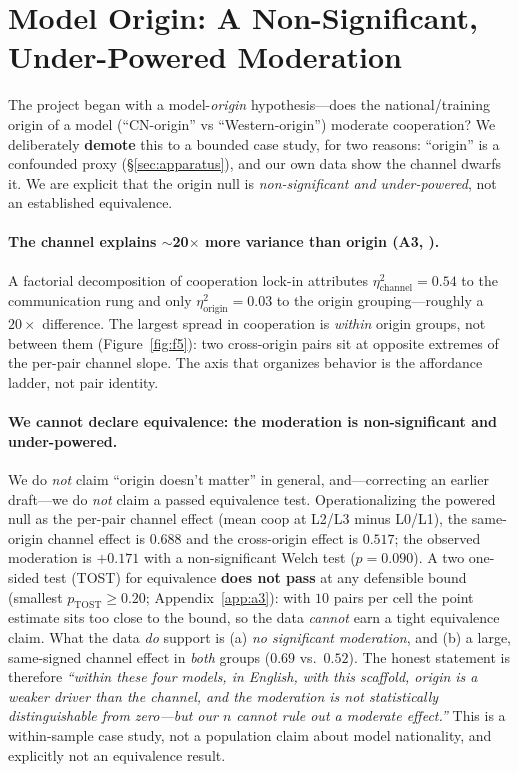 \section{Model Origin: A Non-Significant, Under-Powered Moderation}
\label{sec:origin}

The project began with a model-\emph{origin} hypothesis---does the national/training origin
of a model (``CN-origin'' vs ``Western-origin'') moderate cooperation? We deliberately
\textbf{demote} this to a bounded case study, for two reasons: ``origin'' is a confounded
proxy (\S\ref{sec:apparatus}), and our own data show the channel dwarfs it. We are explicit
that the origin null is \emph{non-significant and under-powered}, not an established
equivalence.

\paragraph{The channel explains $\sim$20$\times$ more variance than origin (A3, \tC).}
A factorial decomposition of cooperation lock-in attributes
$\eta^2_{\text{channel}}=0.54$ to the communication rung and only
$\eta^2_{\text{origin}}=0.03$ to the origin grouping---roughly a $20\times$ difference. The
largest spread in cooperation is \emph{within} origin groups, not between them
(Figure~\ref{fig:f5}): two cross-origin pairs sit at opposite extremes of the per-pair
channel slope. The axis that organizes behavior is the affordance ladder, not pair
identity.

\paragraph{We cannot declare equivalence: the moderation is non-significant and
under-powered.}
We do \emph{not} claim ``origin doesn't matter'' in general, and---correcting an earlier
draft---we do \emph{not} claim a passed equivalence test. Operationalizing the powered null as
the per-pair channel effect (mean coop at L2/L3 minus L0/L1), the same-origin channel effect is
$0.688$ and the cross-origin effect is $0.517$; the observed moderation is $+0.171$ with a
non-significant Welch test ($p{=}0.090$). A two one-sided test (TOST) for equivalence
\textbf{does not pass} at any defensible bound (smallest $p_{\text{TOST}}\ge0.20$;
Appendix~\ref{app:a3}): with $10$ pairs per cell the point estimate sits too close to the bound,
so the data \emph{cannot} earn a tight equivalence claim. What the data \emph{do} support is
(a) \emph{no significant moderation}, and (b) a large, same-signed channel effect in \emph{both}
groups ($0.69$ vs.\ $0.52$). The honest statement is therefore \emph{``within these four models,
in English, with this scaffold, origin is a weaker driver than the channel, and the moderation
is not statistically distinguishable from zero---but our $n$ cannot rule out a moderate
effect.''} This is a within-sample case study, not a population claim about model nationality,
and explicitly not an equivalence result.

